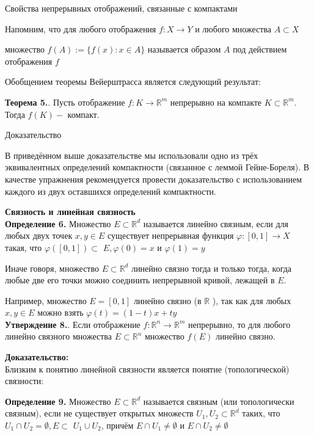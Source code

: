 \documentclass[a4paper,12pt]{article} %
\begin{document}
	Свойства непрерывных отображений, связанные с компактами
	
	Напомним, что для любого отображения $f: X \rightarrow Y$ и любого множества $A \subset X$
	
	множество $f(A):=\{f(x): x \in A\}$ называется образом $A$ под действием отображения $f$
	
	Обобщением теоремы Вейерштрасса является следующий результат:
	
	\textbf{Теорема 5.}. Пусть отображение $f: K \rightarrow \mathbb{R}^{m}$ непрерывно на компакте $K \subset \mathbb{R}^{m}$. Тогда $f(K)-$ компакт.
	
	Доказательство
	
	В приведённом выше доказательстве мы использовали одно из трёх эквивалентных определений компактности (связанное с леммой Гейне-Бореля). В качестве упражнения рекомендуется провести доказательство с использованием каждого из двух оставшихся определений компактности.
	
	\textbf{Связность и линейная связность}\\
	\textbf{Определение 6.} Множество $E \subset \mathbb{R}^{d}$ называется линейно связным, если для любых двух точек $x, y \in E$ существует непрерывная функция $\varphi:[0,1] \rightarrow X$ такая, что $\varphi([0,1]) \subset$ $E, \varphi(0)=x$ и $\varphi(1)=y$
	
	Иначе говоря, множество $E \subset \mathbb{R}^{d}$ линейно связно тогда и только тогда, когда любые две его точки можно соединить непрерывной кривой, лежащей в $E$.
	
	Например, множество $E=[0,1]$ линейно связно (в $\mathbb{R}$ ), так как для любых $x, y \in E$ можно взять $\varphi(t)=(1-t) x+t y$\\ \textbf{Утверждение 8.}. Если отображение $f: \mathbb{R}^{n} \rightarrow \mathbb{R}^{m}$ непрерывно, то для любого линейно связного множества $E \subset \mathbb{R}^{n}$ множество $f(E)$ линейно связно.
	
	\textbf{Доказательство:\\}
	Близким к понятию линейной связности является понятие (топологической) связности:
	
	\textbf{Определение 9.} Множество $E \subset \mathbb{R}^{d}$ называется связным (или топологически связным), если не существует открытых множеств $U_{1}, U_{2} \subset \mathbb{R}^{d}$ таких, что $U_{1} \cap U_{2}=\emptyset, E \subset$ $U_{1} \cup U_{2}$, причём $E \cap U_{1} \neq \emptyset$ и $E \cap U_{2} \neq \emptyset$
	
\end{document}
